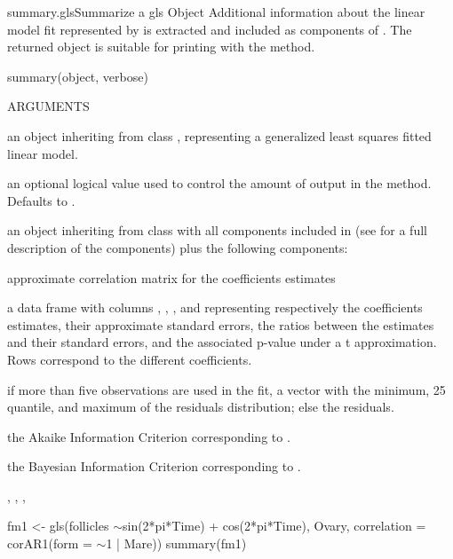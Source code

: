 \documentclass[pdftex]{article} \usepackage{url,graphicx}
\renewcommand{\Twiddle}{\mbox{\(\sim\)}}
\begin{document}
\begin{Helpfile}{summary.gls}{Summarize a gls Object}
Additional information about the linear model fit represented
by  is extracted and included as components of
. The returned object is suitable for printing with the
 method.
\begin{Example}
summary(object, verbose)
\end{Example}
\begin{Argument}{ARGUMENTS}
\item[\Co{object:}]
an object inheriting from class , representing
a generalized least squares fitted linear model.
\item[\Co{verbose:}]
an optional logical value used to control the amount of
output in the  method. Defaults to
.
\end{Argument}
an object inheriting from class  with all components
included in  (see  for a full
description of the components) plus the following components:
\begin{Argument}{}
\vspace{-16pt} 
\item[\Co{corBeta:}]
approximate correlation matrix for the coefficients
estimates
\item[\Co{tTable:}]
a data frame with columns ,
, , and  representing
respectively the coefficients estimates, their approximate standard
errors, the ratios between the estimates and their standard errors,
and the associated p-value under a t approximation. Rows
correspond to the different coefficients.
\item[\Co{residuals:}]
if more than five observations are used in the
 fit, a vector with the minimum, 25
quantile, and maximum of the residuals distribution; else the
residuals.
\item[\Co{AIC:}]
the Akaike Information Criterion corresponding to
.
\item[\Co{BIC:}]
the Bayesian Information Criterion corresponding to
.
\end{Argument}
, , ,
\need 15pt
\vspace{-16pt} 
\begin{Example}
fm1 <- gls(follicles \Twiddle sin(2*pi*Time) + cos(2*pi*Time), Ovary,
           correlation = corAR1(form = \Twiddle 1 | Mare))
summary(fm1)
\end{Example}
\end{Helpfile}
\end{document}
